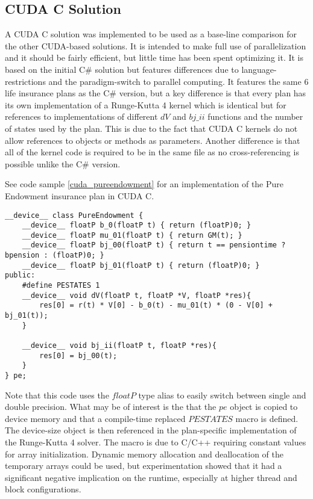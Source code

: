 \subsection{CUDA C Solution}
A CUDA C solution was implemented to be used as a base-line comparison for the other CUDA-based solutions.
It is intended to make full use of parallelization and it should be fairly efficient, but little time has been spent optimizing it.
It is based on the initial C\# solution but features differences due to language-restrictions and the paradigm-switch to parallel computing.
It features the same 6 life insurance plans as the C\# version, but a key difference is that every plan has its own implementation of a Runge-Kutta 4 kernel which is identical but for references to implementations of different $dV$ and $bj\_ii$ functions and the number of states used by the plan.
This is due to the fact that CUDA C kernels do not allow references to objects or methods as parameters. %
Another difference is that all of the kernel code is required to be in the same file as no cross-referencing is possible unlike the C\# version.

See code sample \ref{cuda_pureendowment} for an implementation of the Pure Endowment insurance plan in CUDA C.
\begin{lstlisting}[language=cudac, caption=The pure endowment insurance plan expressed in CUDA C, label=cuda_pureendowment]
__device__ class PureEndowment {
	__device__ floatP b_0(floatP t) { return (floatP)0; }
	__device__ floatP mu_01(floatP t) { return GM(t); }
	__device__ floatP bj_00(floatP t) { return t == pensiontime ? bpension : (floatP)0; }
	__device__ floatP bj_01(floatP t) { return (floatP)0; }
public:
	#define PESTATES 1
	__device__ void dV(floatP t, floatP *V, floatP *res){ 
		res[0] = r(t) * V[0] - b_0(t) - mu_01(t) * (0 - V[0] + bj_01(t));
	}

	__device__ void bj_ii(floatP t, floatP *res){
		res[0] = bj_00(t);
	}
} pe;
\end{lstlisting}

Note that this code uses the $floatP$ type alias to easily switch between single and double precision.
What may be of interest is the that the $pe$ object is copied to device memory and that a compile-time replaced $PESTATES$ macro is defined.
The device-size object is then referenced in the plan-specific implementation of the Runge-Kutta 4 solver.
The macro is due to C/C++ requiring constant values for array initialization.
Dynamic memory allocation and deallocation of the temporary arrays could be used, but experimentation showed that it had a significant negative implication on the runtime, especially at higher thread and block configurations.

